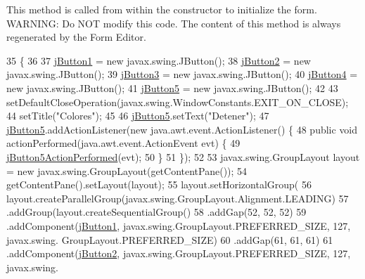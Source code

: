 This method is called from within the constructor to initialize the form. W\+A\+R\+N\+I\+NG\+: Do N\+OT modify this code. The content of this method is always regenerated by the Form Editor. 
\begin{DoxyCode}
35                                   \{
36  
37         \mbox{\hyperlink{class_ejemplo2_1_1_colores_a42bfb6444d7ec536cc713e227d90e1ba}{jButton1}} = \textcolor{keyword}{new} javax.swing.JButton();
38         \mbox{\hyperlink{class_ejemplo2_1_1_colores_a43f88dce24ac914a20f0f77be8e5bebb}{jButton2}} = \textcolor{keyword}{new} javax.swing.JButton();
39         \mbox{\hyperlink{class_ejemplo2_1_1_colores_adbd4afdc65544ac098b878dc8fec5838}{jButton3}} = \textcolor{keyword}{new} javax.swing.JButton();
40         \mbox{\hyperlink{class_ejemplo2_1_1_colores_a24dad1da5dc4da01bc9d7de20ac614b5}{jButton4}} = \textcolor{keyword}{new} javax.swing.JButton();
41         \mbox{\hyperlink{class_ejemplo2_1_1_colores_a35c6c2ec6c3ceb50aa3eb4b65558fc0f}{jButton5}} = \textcolor{keyword}{new} javax.swing.JButton();
42  
43         setDefaultCloseOperation(javax.swing.WindowConstants.EXIT\_ON\_CLOSE);
44         setTitle(\textcolor{stringliteral}{"Colores"});
45  
46         \mbox{\hyperlink{class_ejemplo2_1_1_colores_a35c6c2ec6c3ceb50aa3eb4b65558fc0f}{jButton5}}.setText(\textcolor{stringliteral}{"Detener"});
47         \mbox{\hyperlink{class_ejemplo2_1_1_colores_a35c6c2ec6c3ceb50aa3eb4b65558fc0f}{jButton5}}.addActionListener(\textcolor{keyword}{new} java.awt.event.ActionListener() \{
48             \textcolor{keyword}{public} \textcolor{keywordtype}{void} actionPerformed(java.awt.event.ActionEvent evt) \{
49                 \mbox{\hyperlink{class_ejemplo2_1_1_colores_ab9e355df5d63821c45cb7fc08541deb3}{jButton5ActionPerformed}}(evt);
50             \}
51         \});
52  
53         javax.swing.GroupLayout layout = \textcolor{keyword}{new} javax.swing.GroupLayout(getContentPane());
54         getContentPane().setLayout(layout);
55         layout.setHorizontalGroup(
56             layout.createParallelGroup(javax.swing.GroupLayout.Alignment.LEADING)
57             .addGroup(layout.createSequentialGroup()
58                 .addGap(52, 52, 52)
59                 .addComponent(\mbox{\hyperlink{class_ejemplo2_1_1_colores_a42bfb6444d7ec536cc713e227d90e1ba}{jButton1}}, javax.swing.GroupLayout.PREFERRED\_SIZE, 127, javax.swing.
      GroupLayout.PREFERRED\_SIZE)
60                 .addGap(61, 61, 61)
61                 .addComponent(\mbox{\hyperlink{class_ejemplo2_1_1_colores_a43f88dce24ac914a20f0f77be8e5bebb}{jButton2}}, javax.swing.GroupLayout.PREFERRED\_SIZE, 127, javax.swing.

\end{DoxyCode}
